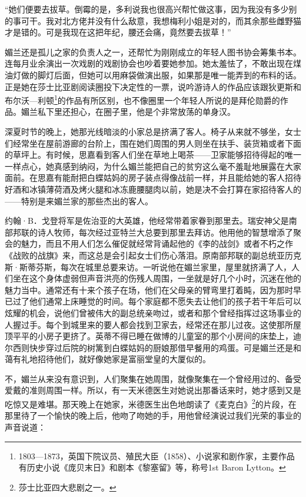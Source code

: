 \par “她们便要去拔草。倒霉的是，多利说我也很高兴帮忙做这事，因为我没有多少别的事可干。我对北方佬并没有什么敌意，我想梅利小姐是对的，而其余那些雌野猫才是错的。可是我现在这把年纪，腰还会痛，竟然要去拔草！”
\par 媚兰还是孤儿之家的负责人之一，还帮忙为刚刚成立的年轻人图书协会筹集书本。连每月业余演出一次戏剧的戏剧协会也吵着要她参加。她太羞怯了，不敢出现在煤油灯做的脚灯后面，但她可以用麻袋做演出服，如果那是唯一能弄到的布料的话。正是她在莎士比亚剧阅读圈投下决定性的一票，说吟游诗人的作品应该跟狄更斯和布尔沃—利顿\footnote{1803—1873，英国下院议员、殖民大臣（1858）、小说家和剧作家，主要作品有历史小说《庞贝末日》和剧本《黎塞留》等，称号1st Baron Lytton。}的作品有所区别，也不像圈里一个年轻人所说的是拜伦勋爵的作品。媚兰私下里还担心，在圈子里，他是个非常放荡的单身汉。
\par 深夏时节的晚上，她那光线暗淡的小家总是挤满了客人。椅子从来就不够坐，女士们经常坐在屋前游廊的台阶上，围在她们周围的男人则坐在扶手、装货箱或者下面的草坪上。有时候，思嘉看到客人们坐在草地上喝茶——卫家能够招待得起的唯一一样点心，她真感到纳闷，为什么媚兰能把自己的贫穷这么毫不羞耻地展露在大家面前。在思嘉有能耐把白蝶姑妈的房子装点得像战前一样，并且能给她的客人招待好酒和冰镇薄荷酒及烤火腿和冰冻鹿腰腿肉以前，她是决不会打算在家招待客人的——特别是来媚兰家的那些杰出的客人。
\par 约翰·B．戈登将军是佐治亚的大英雄，他经常带着家眷到那里去。瑞安神父是南部邦联的诗人牧师，每次经过亚特兰大总要到那里去拜访。他用他的智慧增添了聚会的魅力，而且不用人们怎么催促就经常背诵起他的《李的战剑》或者不朽之作《战败的战旗》来，而这总是会引起女士们伤心落泪。原南部邦联的副总统亚历克斯·斯蒂芬斯，每次在城里总要来访。一听说他在媚兰家里，屋里就挤满了人，人们坐在这个身体虚弱但声音洪亮的伤残人周围，一坐就是好几个小时，沉迷在他的魅力当中。通常还有十来个孩子在场，他们在父母亲的臂弯里打着盹，因为那时早已过了他们通常上床睡觉的时间。每个家庭都不愿失去让他们的孩子若干年后可以炫耀的机会，说他们曾被伟大的副总统亲吻过，或者和那个曾经指挥过这场事业的人握过手。每个到城里来的要人都会找到卫家去，经常还在那儿过夜。这使那所屋顶平平的小房子更挤了。英蒂不得已睡在做博的儿童室的那个小房间的床垫上，迪尔西则快步穿过后院的树篱到白蝶姑妈的厨娘那借早餐用的鸡蛋。可是媚兰还是和蔼有礼地招待他们，就好像她家是富丽堂皇的大厦似的。
\par 不，媚兰从来没有意识到，人们聚集在她周围，就像聚集在一个曾经用过的、备受爱戴的准则周围一样。所以，有一天米德医生对她说出那番话来时，她才感到又是吃惊又是难堪。那天晚上在她家，米德医生出色地朗读了《麦克白》\footnote{莎士比亚四大悲剧之一。}的片段，在那里待了一个愉快的晚上后，他吻了吻她的手，用他曾经演说过我们光荣的事业的声音说道：
